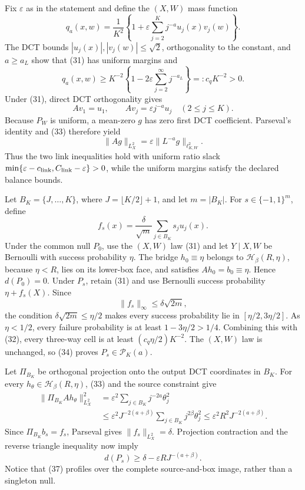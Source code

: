 Fix \(\varepsilon\) as in the statement and define the \((X,W)\) mass function
\[
 q_a(x,w)=\frac1{K^2}\left\{1+\varepsilon\sum_{j=2}^Kj^{-a}u_j(x)v_j(w)\right\}. \tag{31}
\]
The DCT bounds \(|u_j(x)|,|v_j(w)|\le\sqrt2\), orthogonality to the constant, and \(a\ge a_L\) show that (31) has uniform margins and
\[
 q_a(x,w)\ge K^{-2}\left\{1-2\varepsilon\sum_{j=2}^{\infty}j^{-a_L}\right\}=:c_qK^{-2}>0. \tag{32}
\]
Under (31), direct DCT orthogonality gives
\[
 Av_1=u_1,
 \qquad
 Av_j=\varepsilon j^{-a}u_j\quad(2\le j\le K). \tag{33}
\]
Because \(P_W\) is uniform, a mean-zero \(g\) has zero first DCT coefficient.  Parseval's identity and (33) therefore yield
\[
 \|Ag\|_{L^2_X}=\varepsilon\|L^{-a}g\|_{\ell^2_{K,W}}. \tag{34}
\]
Thus the two link inequalities hold with uniform ratio slack
\(\min\{\varepsilon-c_{\rm link},C_{\rm link}-\varepsilon\}>0\), while the uniform margins satisfy the declared balance bounds.

Let \(B_K=\{J,\ldots,K\}\), where \(J=\lfloor K/2\rfloor+1\), and let \(m=|B_K|\).  For \(s\in\{-1,1\}^m\), define
\[
 f_s(x)=\frac\delta{\sqrt m}\sum_{j\in B_K}s_ju_j(x). \tag{35}
\]
Under the common null \(P_0\), use the \((X,W)\) law (31) and let \(Y\mid X,W\) be Bernoulli with success probability \(\eta\).  The bridge \(h_0\equiv\eta\) belongs to \(\mathcal H_\beta(R,\eta)\), because \(\eta<R\), lies on its lower-box face, and satisfies \(Ah_0=b_0\equiv\eta\).  Hence \(d(P_0)=0\).  Under \(P_s\), retain (31) and use Bernoulli success probability \(\eta+f_s(X)\).  Since
\[
 \|f_s\|_\infty\le\delta\sqrt{2m}, \tag{36}
\]
the condition \(\delta\sqrt{2m}\le\eta/2\) makes every success probability lie in \([\eta/2,3\eta/2]\).  As \(\eta<1/2\), every failure probability is at least \(1-3\eta/2>1/4\).  Combining this with (32), every three-way cell is at least \((c_q\eta/2)K^{-2}\).  The \((X,W)\) law is unchanged, so (34) proves \(P_s\in\mathcal P_K(a)\).

Let \(\Pi_{B_K}\) be orthogonal projection onto the output DCT coordinates in \(B_K\).  For every \(h_\theta\in\mathcal H_\beta(R,\eta)\), (33) and the source constraint give
\[
 \begin{split}
 \|\Pi_{B_K}Ah_\theta\|_{L^2_X}^2
 &=\varepsilon^2\sum_{j\in B_K}j^{-2a}\theta_j^2\\
 &\le \varepsilon^2J^{-2(a+\beta)}
 \sum_{j\in B_K}j^{2\beta}\theta_j^2
 \le\varepsilon^2R^2J^{-2(a+\beta)}.
 \end{split}\tag{37}
\]
Since \(\Pi_{B_K}b_s=f_s\), Parseval gives \(\|f_s\|_{L^2_X}=\delta\).  Projection contraction and the reverse triangle inequality now imply
\[
 d(P_s)\ge\delta-\varepsilon RJ^{-(a+\beta)}. \tag{38}
\]
Notice that (37) profiles over the complete source-and-box image, rather than a singleton null.


